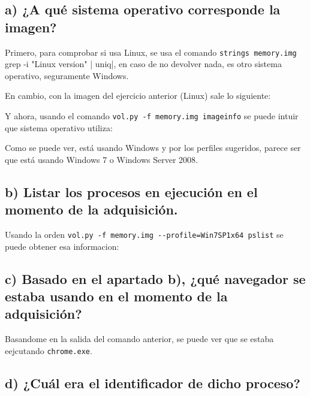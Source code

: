 \documentclass{article}
\begin{document}
\subsection{a) ¿A qué sistema operativo corresponde la imagen?}

Primero, para comprobar si usa Linux, se usa el comando \verb|strings memory.img | grep -i "Linux version" | uniq|, en caso de no devolver nada, es otro sistema operativo, seguramente Windows.


En cambio, con la imagen del ejercicio anterior (Linux) sale lo siguiente:



Y ahora, usando el comando \verb|vol.py -f memory.img imageinfo| se puede intuir que sistema operativo utiliza:


Como se puede ver, está usando Windows y por los perfiles sugeridos, parece ser que está usando Windows 7 o Windows Server 2008.

\subsection{b) Listar los procesos en ejecución en el momento de la adquisición.}

Usando la orden \verb|vol.py -f memory.img --profile=Win7SP1x64 pslist| se puede obtener esa informacion:


\subsection{c) Basado en el apartado b), ¿qué navegador se estaba usando en el momento de la adquisición?}

Basandome en la salida del comando anterior, se puede ver que se estaba eejcutando \verb|chrome.exe|.


\subsection{d) ¿Cuál era el identificador de dicho proceso?}
\end{document}
